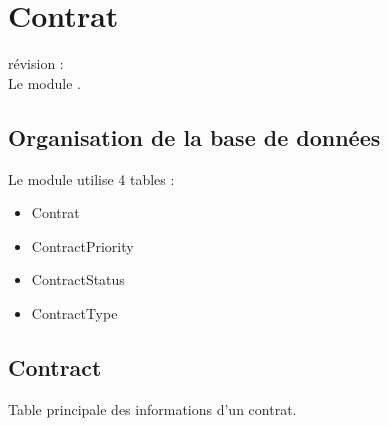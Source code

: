

\clearpage
\section{Contrat}

révision :  \\
Le module \contract \obm.\\


\subsection{Organisation de la base de données}

Le module \contract utilise 4 tables :
\begin{itemize}
 \item Contrat
 \item ContractPriority
 \item ContractStatus
 \item ContractType
\end{itemize}


\subsection{Contract}
Table principale des informations d'un contrat.\\


